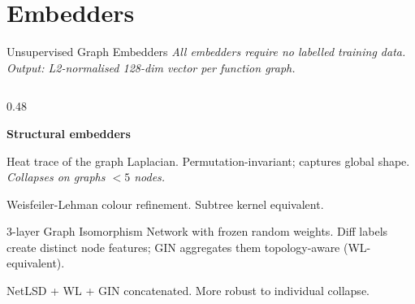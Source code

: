 \documentclass[aspectratio=169,10pt]{beamer}
\begin{document}

\section{Embedders}

\begin{frame}{Unsupervised Graph Embedders}
\textit{All embedders require no labelled training data.
Output: L2-normalised 128-dim vector per function graph.}

\vspace{0.5em}
\begin{columns}[T]
\begin{column}{0.48\textwidth}

  \textbf{\textcolor{c1}{Structural embedders}}
  \begin{description}
    \item[\textbf{NetLSD}] Heat trace of the graph Laplacian.
      Permutation-invariant; captures global shape.
      \textit{Collapses on graphs $<5$ nodes.}
    \item[\textbf{WL}] Weisfeiler-Lehman colour refinement. Subtree kernel equivalent.
    \item[\textbf{GIN}] 3-layer Graph Isomorphism Network with
      frozen random weights. Diff labels create distinct node
      features; GIN aggregates them topology-aware (WL-equivalent).
    \item[\textbf{Combined}] NetLSD + WL + GIN concatenated.
    More robust to individual collapse.
  \end{description}

\end{column}



\end{columns}
\end{frame}
\end{document}
